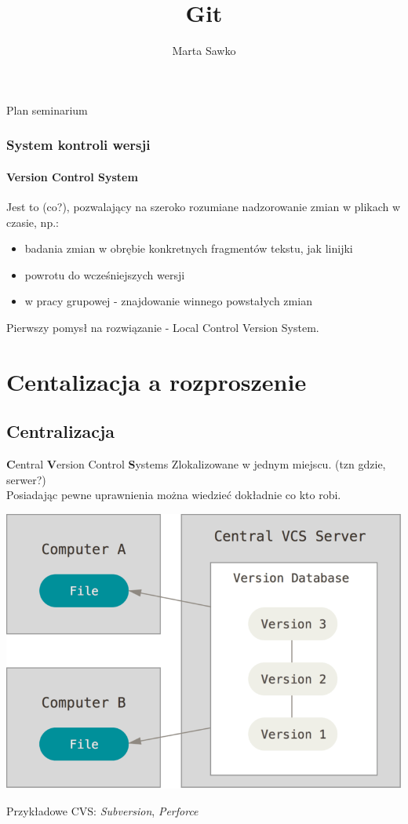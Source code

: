 \documentclass{beamer}
\title{Git}
\author{Marta Sawko}
\begin{document}
\frame{\titlepage}
\begin{frame}{Plan seminarium}
  \tableofcontents
\end{frame}

\begin{frame}
 \frametitle{System kontroli wersji}
 \framesubtitle{\textbf{V}ersion \textbf{C}ontrol \textbf{S}ystem}
 Jest to (co?), pozwalający na szeroko rozumiane nadzorowanie zmian w plikach w czasie, np.:
 \begin{itemize}
  \item badania zmian w obrębie konkretnych fragmentów tekstu, jak linijki
  \item powrotu do wcześniejszych wersji 
  \item w pracy grupowej - znajdowanie winnego powstałych zmian
 \end{itemize} 
 Pierwszy pomysł na rozwiązanie - Local Control Version System.
\end{frame}

\section{Centalizacja a rozproszenie}
\subsection{Centralizacja}
\begin{frame}{\textbf{C}entral \textbf{V}ersion Control \textbf{S}ystems}
  Zlokalizowane w jednym miejscu. (tzn gdzie, serwer?) \\
  Posiadając pewne uprawnienia można wiedzieć dokładnie co kto robi.\\
  \begin{center}
   \includegraphics[height=0.4\textwidth]{./obrazki/fig-1_2.png}
 \end{center}
  Przykładowe CVS\@: \textit{Subversion}, \textit{Perforce}
\end{frame}
\end{document}
